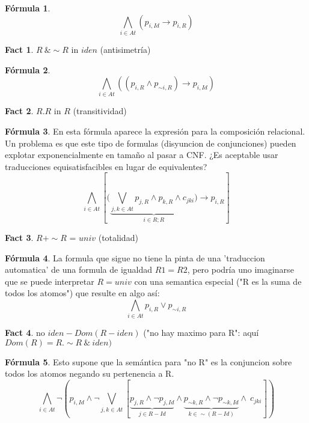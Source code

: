 \documentclass{article}
\theoremstyle{definition}
\newtheorem*{fact}{Fact}
\newtheorem*{formula}{Fórmula}
\begin{document}
\begin{formula} 
\[
    \bigwedge_{i\in At} (p_{i,Id} \rightarrow p_{i,R})
\]
\end{formula}

\begin{fact}
$R\ \& \sim R$ in $iden$ (antisimetría)
\end{fact}
\begin{formula}
\[
    \bigwedge_{i \in At} ((p_{i,R} \land p_{\sim i, R}) \rightarrow p_{i, Id})
\]
\end{formula}
\begin{fact}
$R.R$ in $R$ (transitividad)
\end{fact}
\begin{formula} En esta fórmula aparece la expresión para la composición relacional. Un problema es que este tipo de formulas (disyuncion de conjunciones) pueden explotar exponencialmente en tamaño al pasar a CNF. ¿Es aceptable usar traducciones equisatisfacibles en lugar de equivalentes?
\[
    \bigwedge_{i \in At} [(\underbrace{\bigvee_{j,k \in At} p_{j,R} \land p_{k,R} \land c_{jki})}_{i \in R;R } \rightarrow p_{i, R}]
\]
\end{formula}
\begin{fact}
$R + \sim R$ = $univ$ (totalidad)
\end{fact}
\begin{formula} La formula que sigue no tiene la pinta de una 'traduccion automatica' de una formula de igualdad $R1 = R2$, pero podría uno imaginarse que se puede interpretar $R = univ$ con una semantica especial ("R es la suma de todos los atomos") que resulte en algo así:
\[
    \bigwedge_{i \in At} p_{i, R} \vee p_{\sim i, R}
\]
\end{formula} 
\begin{fact}
no $iden - Dom(R - iden)$ ("no hay maximo para R": aquí $Dom(R) = R.\sim R\ \&\ iden)$
\end{fact}
\begin{formula} Esto supone que la semántica para "no R" es la conjuncion sobre todos los atomos negando su pertenencia a R.
\[
    \bigwedge_{i \in At} \lnot (p_{i,Id} \land \lnot \bigvee_{j,k \in At} [ \underbrace{p_{j,R} \land \lnot p_{j, Id}}_{j \in R - Id} \land \underbrace{p_{\sim k,R} \land \lnot p_{\sim k, Id}}_{k \in \sim (R - Id)} \land \ c_{jki} ])
\]
\end{formula}
\end{document}
